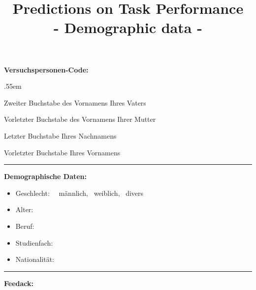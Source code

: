 \documentclass[
ngerman,
accentcolor=9c,%
identbarcolor=9c,
]{tudaexercise}
\title{Predictions on Task Performance\\- Demographic data -}
\begin{document}
\maketitle

\textbf{Versuchspersonen-Code:}
\begin{itemize}
	\begin{minipage}{.45\textwidth}
		\vspace{-2cm}
		\itemsep.55em
		\item Zweiter Buchstabe des Vornamens Ihres Vaters
		\item Vorletzter Buchstabe des Vornamens Ihrer Mutter
		\item Letzter Buchstabe Ihres Nachnamens
		\item Vorletzter Buchstabe Ihres Vornamens	
	\end{minipage}
	\begin{minipage}{.55\textwidth}
	\end{minipage}
\end{itemize}

\par\noindent\rule{\textwidth}{0.4pt}

\noindent\textbf{Demographische Daten:}

\begin{itemize}
	\item Geschlecht: ~\Square ~männlich, \Square ~weiblich, \Square ~divers
	\item Alter:
	\item Beruf:
	\item Studienfach:
	\item Nationalität:
\end{itemize}

\vspace{8mm}

\par\noindent\rule{\textwidth}{.4pt}

\vspace{8mm}

\textbf{Feedack:}

\fbox{\color{white}\rule{.99\textwidth}{7cm}\color{black}}
\end{document}
